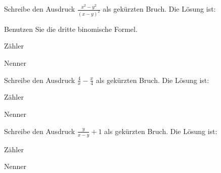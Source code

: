 \documentclass{ximera}
\begin{document}
\begin{shuffle}
\begin{question}
Schreibe den Ausdruck $\frac{x^2-y^2}{(x-y)^2}$ als gekürzten Bruch.
Die Lösung ist:
\begin{solution}
\begin{hint}
Benutzen Sie die dritte binomische Formel.
\end{hint}
Zähler 
\end{solution}
\begin{solution}
Nenner 
\end{solution}
\end{question}

\begin{question}
Schreibe den Ausdruck $\frac{4}{x} - \frac{x}{4}$ als gekürzten Bruch.
Die Lösung ist:
\begin{solution}
Zähler 
\end{solution}
\begin{solution}
Nenner 
\end{solution}
\end{question}

\begin{question}
Schreibe den Ausdruck $\frac{y}{x-y} +1$ als gekürzten Bruch.
Die Lösung ist:
\begin{solution}
Zähler 
\end{solution}
\begin{solution}
Nenner 
\end{solution}
\end{question}

\end{shuffle}
\end{document}
